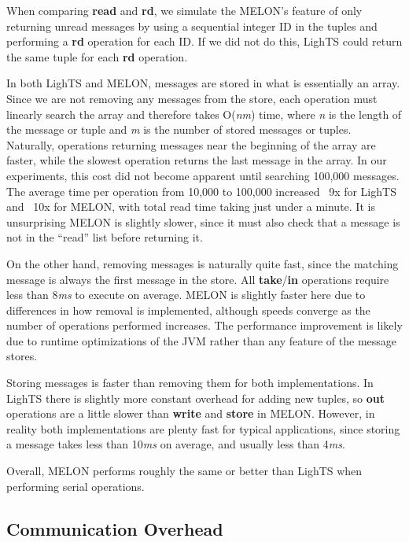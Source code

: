 \documentclass[lnicst]{svmultln}
\begin{document}
When comparing \textbf{read} and \textbf{rd}, we simulate the MELON's feature of only returning unread messages by using a sequential integer ID in the tuples and performing a \textbf{rd} operation for each ID. If we did not do this, LighTS could return the same tuple for each \textbf{rd} operation.

In both LighTS and MELON, messages are stored in what is essentially an array. Since we are not removing any messages from the store, each operation must linearly search the array and therefore takes O(\textit{nm}) time, where \textit{n} is the length of the message or tuple and \textit{m} is the number of stored messages or tuples. Naturally, operations returning messages near the beginning of the array are faster, while the slowest operation returns the last message in the array. In our experiments, this cost did not become apparent until searching 100,000 messages. The average time per operation from 10,000 to 100,000 increased ~9x for LighTS and ~10x for MELON, with total read time taking just under a minute. It is unsurprising MELON is slightly slower, since it must also check that a message is not in the ``read'' list before returning it.

On the other hand, removing messages is naturally quite fast, since the matching message is always the first message in the store. All \textbf{take}/\textbf{in} operations require less than 8\textit{ms} to execute on average. MELON is slightly faster here due to differences in how removal is implemented, although speeds converge as the number of operations performed increases. The performance improvement is likely due to runtime optimizations of the JVM rather than any feature of the message stores.

Storing messages is faster than removing them for both implementations. In LighTS there is slightly more constant overhead for adding new tuples, so \textbf{out} operations are a little slower than \textbf{write} and \textbf{store} in MELON.  However, in reality both implementations are plenty fast for typical applications, since storing a message takes less than 10\textit{ms} on average, and usually less than 4\textit{ms}.

Overall, MELON performs roughly the same or better than LighTS when performing serial operations.

\subsection{Communication Overhead}
\end{document}
